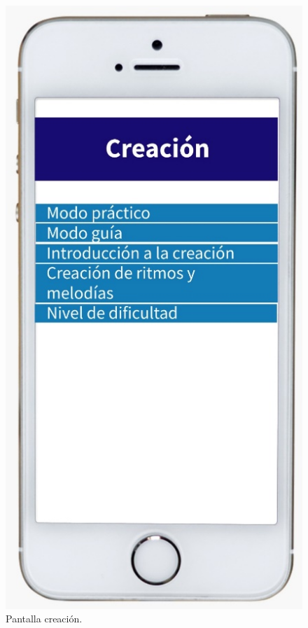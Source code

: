 \documentclass[spanish]{textolivre}
\begin{document}
\noindent
\begin{figure}[t!]
    \centering
    \begin{minipage}{.3\textwidth}
    \includegraphics[width=\textwidth]{Fig9.png}
    \caption{Pantalla creación.}
    \end{minipage}
    \end{figure}
\end{document}
